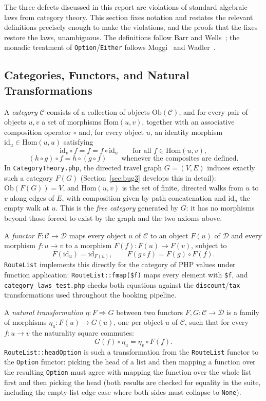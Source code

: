 The three defects discussed in this report are violations of standard algebraic laws from category theory. This section fixes notation and restates the relevant definitions precisely enough to make the violations, and the proofs that the fixes restore the laws, unambiguous. The definitions follow Barr and Wells~\cite{BarrWells1990}; the monadic treatment of \texttt{Option}/\texttt{Either} follows Moggi~\cite{Moggi1991} and Wadler~\cite{Wadler1992}.

\subsection{Categories, Functors, and Natural Transformations}

A \emph{category} $\mathcal{C}$ consists of a collection of objects $\mathrm{Ob}(\mathcal{C})$, and for every pair of objects $u,v$ a set of morphisms $\mathrm{Hom}(u,v)$, together with an associative composition operator $\circ$ and, for every object $u$, an identity morphism $\mathrm{id}_u \in \mathrm{Hom}(u,u)$ satisfying
\[
  \mathrm{id}_v \circ f = f = f \circ \mathrm{id}_u \qquad \text{for all } f \in \mathrm{Hom}(u,v),
\]
\[
  (h \circ g) \circ f = h \circ (g \circ f) \qquad \text{whenever the composites are defined.}
\]
In \texttt{CategoryTheory.php}, the directed travel graph $G=(V,E)$ induces exactly such a category $F(G)$ (Section~\ref{sec:bug3} develops this in detail): $\mathrm{Ob}(F(G))=V$, and $\mathrm{Hom}(u,v)$ is the set of finite, directed walks from $u$ to $v$ along edges of $E$, with composition given by path concatenation and $\mathrm{id}_u$ the empty walk at $u$. This is the \emph{free category} generated by $G$: it has no morphisms beyond those forced to exist by the graph and the two axioms above.

A \emph{functor} $F : \mathcal{C} \to \mathcal{D}$ maps every object $u$ of $\mathcal{C}$ to an object $F(u)$ of $\mathcal{D}$ and every morphism $f : u \to v$ to a morphism $F(f) : F(u) \to F(v)$, subject to
\[
  F(\mathrm{id}_u) = \mathrm{id}_{F(u)}, \qquad F(g \circ f) = F(g) \circ F(f).
\]
\texttt{RouteList} implements this directly for the category of PHP values under function application: \texttt{RouteList::fmap(\$f)} maps every element with \texttt{\$f}, and \texttt{category\_laws\_test.php} checks both equations against the \texttt{discount}/\texttt{tax} transformations used throughout the booking pipeline.

A \emph{natural transformation} $\eta : F \Rightarrow G$ between two functors $F,G:\mathcal{C}\to\mathcal{D}$ is a family of morphisms $\eta_u : F(u) \to G(u)$, one per object $u$ of $\mathcal{C}$, such that for every $f : u \to v$ the naturality square commutes:
\[
  G(f) \circ \eta_u = \eta_v \circ F(f).
\]
\texttt{RouteList::headOption} is such a transformation from the \texttt{RouteList} functor to the \texttt{Option} functor: picking the head of a list and then mapping a function over the resulting \texttt{Option} must agree with mapping the function over the whole list first and then picking the head (both results are checked for equality in the suite, including the empty-list edge case where both sides must collapse to \texttt{None}).

